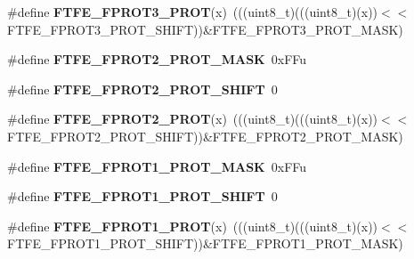 \begin{DoxyCompactItemize}
\item 
\#define {\bfseries F\+T\+F\+E\+\_\+\+F\+P\+R\+O\+T3\+\_\+\+P\+R\+OT}(x)~(((uint8\+\_\+t)(((uint8\+\_\+t)(x))$<$$<$F\+T\+F\+E\+\_\+\+F\+P\+R\+O\+T3\+\_\+\+P\+R\+O\+T\+\_\+\+S\+H\+I\+FT))\&F\+T\+F\+E\+\_\+\+F\+P\+R\+O\+T3\+\_\+\+P\+R\+O\+T\+\_\+\+M\+A\+SK)\hypertarget{group__FTFE__Register__Masks_gada35908a1ae7d348cf4cd4098d04ad4a}{}\label{group__FTFE__Register__Masks_gada35908a1ae7d348cf4cd4098d04ad4a}

\item 
\#define {\bfseries F\+T\+F\+E\+\_\+\+F\+P\+R\+O\+T2\+\_\+\+P\+R\+O\+T\+\_\+\+M\+A\+SK}~0x\+F\+Fu\hypertarget{group__FTFE__Register__Masks_gabb7b44e7187830da8206888d207d9e87}{}\label{group__FTFE__Register__Masks_gabb7b44e7187830da8206888d207d9e87}

\item 
\#define {\bfseries F\+T\+F\+E\+\_\+\+F\+P\+R\+O\+T2\+\_\+\+P\+R\+O\+T\+\_\+\+S\+H\+I\+FT}~0\hypertarget{group__FTFE__Register__Masks_ga64e4b03106065078a966a0505a18f7bc}{}\label{group__FTFE__Register__Masks_ga64e4b03106065078a966a0505a18f7bc}

\item 
\#define {\bfseries F\+T\+F\+E\+\_\+\+F\+P\+R\+O\+T2\+\_\+\+P\+R\+OT}(x)~(((uint8\+\_\+t)(((uint8\+\_\+t)(x))$<$$<$F\+T\+F\+E\+\_\+\+F\+P\+R\+O\+T2\+\_\+\+P\+R\+O\+T\+\_\+\+S\+H\+I\+FT))\&F\+T\+F\+E\+\_\+\+F\+P\+R\+O\+T2\+\_\+\+P\+R\+O\+T\+\_\+\+M\+A\+SK)\hypertarget{group__FTFE__Register__Masks_gab70774ece52ac5b648e7668853be4405}{}\label{group__FTFE__Register__Masks_gab70774ece52ac5b648e7668853be4405}

\item 
\#define {\bfseries F\+T\+F\+E\+\_\+\+F\+P\+R\+O\+T1\+\_\+\+P\+R\+O\+T\+\_\+\+M\+A\+SK}~0x\+F\+Fu\hypertarget{group__FTFE__Register__Masks_ga1e6a0ea36b9fdb8f847e4a750172e45a}{}\label{group__FTFE__Register__Masks_ga1e6a0ea36b9fdb8f847e4a750172e45a}

\item 
\#define {\bfseries F\+T\+F\+E\+\_\+\+F\+P\+R\+O\+T1\+\_\+\+P\+R\+O\+T\+\_\+\+S\+H\+I\+FT}~0\hypertarget{group__FTFE__Register__Masks_ga0b97e40cb2ae6312e945abee0e35ad75}{}\label{group__FTFE__Register__Masks_ga0b97e40cb2ae6312e945abee0e35ad75}

\item 
\#define {\bfseries F\+T\+F\+E\+\_\+\+F\+P\+R\+O\+T1\+\_\+\+P\+R\+OT}(x)~(((uint8\+\_\+t)(((uint8\+\_\+t)(x))$<$$<$F\+T\+F\+E\+\_\+\+F\+P\+R\+O\+T1\+\_\+\+P\+R\+O\+T\+\_\+\+S\+H\+I\+FT))\&F\+T\+F\+E\+\_\+\+F\+P\+R\+O\+T1\+\_\+\+P\+R\+O\+T\+\_\+\+M\+A\+SK)\hypertarget{group__FTFE__Register__Masks_ga0125c948b5a0d9a057225d1bd2d08967}{}\label{group__FTFE__Register__Masks_ga0125c948b5a0d9a057225d1bd2d08967}


\end{DoxyCompactItemize}
